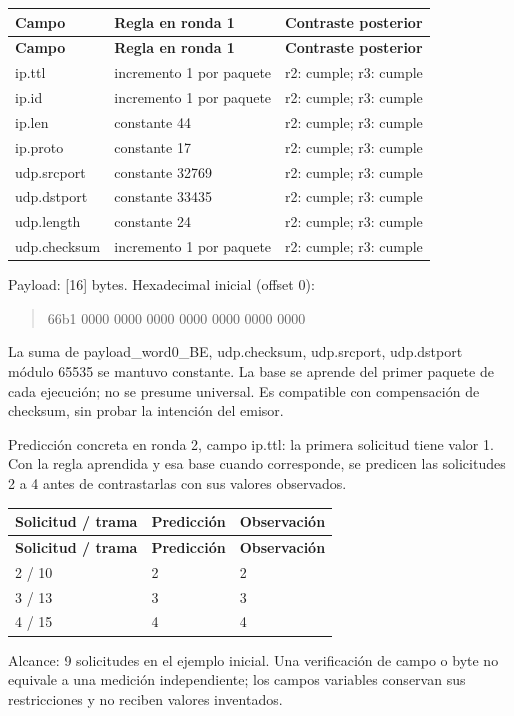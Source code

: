 \begingroup
\fontsize{9}{11}\selectfont
\addtocounter{table}{-1}
\begin{longtable}{p{3.1cm}p{5.8cm}p{5.1cm}}
\toprule
\textbf{Campo} & \textbf{Regla en ronda 1} & \textbf{Contraste posterior} \\ \midrule
\endfirsthead
\toprule
\textbf{Campo} & \textbf{Regla en ronda 1} & \textbf{Contraste posterior} \\ \midrule
\endhead
ip.ttl & incremento 1 por paquete & r2: cumple; r3: cumple \\
ip.id & incremento 1 por paquete & r2: cumple; r3: cumple \\
ip.len & constante 44 & r2: cumple; r3: cumple \\
ip.proto & constante 17 & r2: cumple; r3: cumple \\
udp.srcport & constante 32769 & r2: cumple; r3: cumple \\
udp.dstport & constante 33435 & r2: cumple; r3: cumple \\
udp.length & constante 24 & r2: cumple; r3: cumple \\
udp.checksum & incremento 1 por paquete & r2: cumple; r3: cumple \\
\bottomrule
\end{longtable}
\endgroup
Payload: [16] bytes. Hexadecimal inicial (offset 0):

\begin{quote}\ttfamily\footnotesize\raggedright 66b1 0000 0000 0000 0000 0000 0000 0000\end{quote}
La suma de payload\_\allowbreak{}word0\_\allowbreak{}BE, udp.checksum, udp.srcport, udp.dstport módulo 65535 se mantuvo constante. La base se aprende del primer paquete de cada ejecución; no se presume universal. Es compatible con compensación de checksum, sin probar la intención del emisor.

Predicción concreta en ronda 2, campo ip.ttl: la primera solicitud tiene valor 1. Con la regla aprendida y esa base cuando corresponde, se predicen las solicitudes 2 a 4 antes de contrastarlas con sus valores observados.

\begingroup
\fontsize{9}{11}\selectfont
\addtocounter{table}{-1}
\begin{longtable}{p{3.2cm}p{5.1cm}p{5.1cm}}
\toprule
\textbf{Solicitud / trama} & \textbf{Predicción} & \textbf{Observación} \\ \midrule
\endfirsthead
\toprule
\textbf{Solicitud / trama} & \textbf{Predicción} & \textbf{Observación} \\ \midrule
\endhead
2 / 10 & 2 & 2 \\
3 / 13 & 3 & 3 \\
4 / 15 & 4 & 4 \\
\bottomrule
\end{longtable}
\endgroup
Alcance: 9 solicitudes en el ejemplo inicial. Una verificación de campo o byte no equivale a una medición independiente; los campos variables conservan sus restricciones y no reciben valores inventados.

